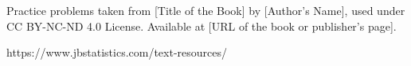 Practice problems taken from [Title of the Book] by [Author's Name], used under CC BY-NC-ND 4.0 License. Available at [URL of the book or publisher's page].

https://www.jbstatistics.com/text-resources/